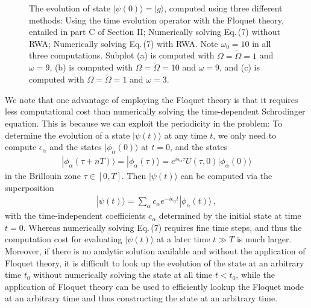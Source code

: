 \documentclass[reprint, amsmath, amssymb, aps]{revtex4-2}
\newcommand{\that}[1]{\widetilde{#1}}
\begin{document}
\begin{figure}
\caption{The evolution of state $|\psi(0)\rangle = |g\rangle$, computed using three different methods: Using the time evolution operator with the Floquet theory, entailed in part C of Section II; Numerically solving Eq.\,(7) without RWA; Numerically solving Eq.\,(7) with RWA. Note $\omega_0 = 10$ in all three computations. Subplot (a) is computed with $\Omega =\that{\Omega} = 1$ and $\omega = 9$, (b) is computed with $\Omega =\that{\Omega} = 10$ and $\omega = 9$, and (c) is computed with $\Omega = \that{\Omega }=1$ and $\omega = 3$.}
\end{figure}

We note that one advantage of employing the Floquet theory is that it requires less computational cost than numerically solving the time-dependent Schrodinger equation. This is because we can exploit the periodicity in the problem: To determine the evolution of a state $|\psi(t)\rangle$
at any time $t$,
we only need to compute $\epsilon_\alpha$ and the states $|\phi_\alpha(0)\rangle$ at $t = 0$, and the states
\begin{align}
|\phi_\alpha(\tau+nT)\rangle=|\phi_\alpha(\tau)\rangle = e^{i\epsilon_\alpha \tau} U(\tau,0) |\phi_\alpha(0)\rangle 
\end{align}
in the Brillouin zone $\tau \in [0,T]$. Then $|\psi(t)\rangle$ can be computed via the superposition
\begin{align}
|\psi(t)\rangle = \sum_\alpha c_\alpha e^{-i\epsilon_\alpha t}|\phi_\alpha(t)\rangle\,,
\end{align}
with the time-independent coefficients $c_\alpha$ determined by the initial state at time $t = 0$. Whereas numerically solving Eq.\,(7) requires fine time steps, and thus the computation cost for evaluating $|\psi(t)\rangle$ at a later time $t\gg T$ is much larger. Moreover, if there is no analytic solution available and without the application of Floquet theory, it is difficult to look up the evolution of the state at an arbitrary time $t_0$ without numerically solving the state at all time $t<t_0$, while the application of Floquet theory can be used to efficiently lookup the Floquet mode at an arbitrary time and thus constructing the state at an arbitrary time. \\
\end{document}
